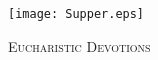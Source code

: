 \fancyhead[RE,LO]{}\fancyhead[RO,LE]{}
\fancyhead[C]{}
\thispagestyle{empty}
{}
  \begin{center}
   \texttt{[image: Supper.eps]}
   \par
   \vspace{2ex}
   	\textsc{\Huge{Eucharistic Devotions}}
   \end{center}